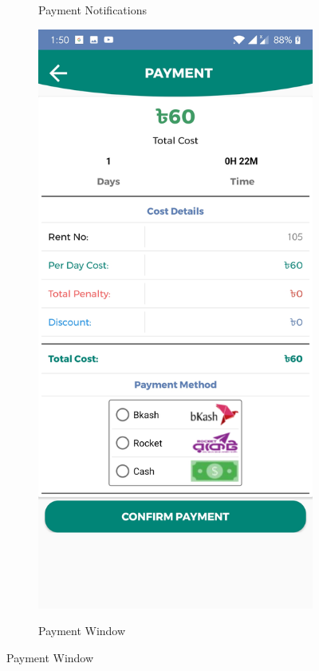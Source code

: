 \documentclass[12pt, english]{article}
\begin{document}
\begin{figure}[h!]
\begin{subfigure}[t]{0.4\textwidth}
        \label{arch5}
        \caption{Payment Notifications}
    \end{subfigure}
    \begin{subfigure}[t]{0.4\textwidth}
    \includegraphics[width=\linewidth]{Payment/payment_window.jpg}
        \label{arch50}
        \caption{Payment Window}
    \end{subfigure}
    \label{fig:arp_os}
\end{figure}
\end{document}
